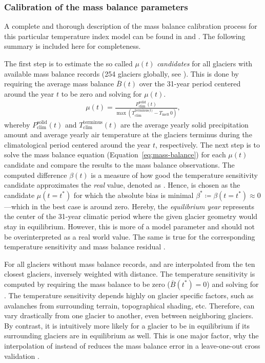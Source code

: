         \subsubsection{Calibration of the mass balance parameters} %
        \label{ssub:mb_calib}

            A complete and thorough description of the mass balance calibration process for this particular temperature index model can be found in \citet[Section 2.1.9-10]{Marzeion2012b} and \citet[][Section 3.3]{Maussion2019}. The following summary is included here for completeness.
            
            The first step is to estimate the so called $\mu(t)$ \emph{candidates} for all glaciers with available mass balance records (254 glaciers globally, see \citet{WGMS2017}). This is done by requiring the average mass balance $\overline B(t)$ over the 31-year period centered around the year $t$ to be zero and solving for $\mu(t)$.
            \begin{align}\label{eq:mu-candidates}
                \mu(t) = \frac{P_\text{clim}^\text{solid}(t)}{\max(T_\text{clim}^\text{terminus(t)} - T_\text{melt}\, 0)},
            \end{align}
            whereby $P_{\text{clim}}^{\text{solid}}(t)$ and $T_{\text{clim}}^{\text{terminus}}(t)$ are the average yearly solid precipitation amount and average yearly air temperature at the glaciers terminus during the climatological period centered around the year $t$, respectively. The next step is to solve the mass balance equation (Equation~\ref{eq:mass-balance}) for each $\mu(t)$ candidate and compare the results to the mass balance observations. The computed difference $\beta(t)$ is a measure of how good the temperature sensitivity candidate approximates the \textit{real} value, denoted as \mustar{}. Hence, \mustar{} is chosen as the candidate $\mu(t = t^*)$ for which the absolute bias is minimal $\beta^* \coloneqq \beta(t = t^*) \approx 0$---which in the best case is around zero. Hereby, the \textit{equilibrium year} \tstar{} represents the center of the 31-year climatic period where the given glacier geometry would stay in equilibrium. However, this is more of a model parameter and should not be overinterpreted as a real world value. The same is true for the corresponding temperature sensitivity \mustar{} and mass balance residual \bias{}.

            For all glaciers without mass balance records, \tstar{} and \bias{} are interpolated from the ten closest glaciers, inversely weighted with distance. The temperature sensitivity is computed by requiring the mass balance to be zero ($\overline B(t^*) = 0$) and solving for \mustar{}. The temperature sensitivity \mustar{} depends highly on glacier specific factors, such as avalanches from surrounding terrain, topographical shading, etc. Therefore, \mustar{} can vary drastically from one glacier to another, even between neighboring glaciers. By contrast, it is intuitively more likely for a glacier to be in equilibrium if its surrounding glaciers are in equilibrium as well. This is one major factor, why the interpolation of \tstar{} instead of \mustar{} reduces the mass balance error in a leave-one-out cross validation \citep[cf.][]{Marzeion2012b, Maussion2019}.

